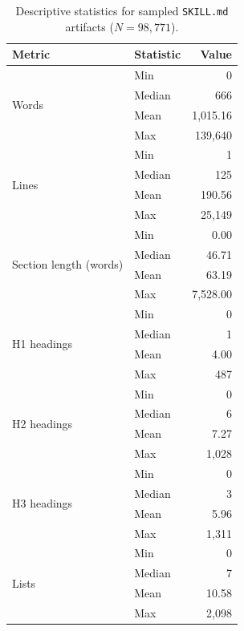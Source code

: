 \begin{table}[t]
\centering
\caption{Descriptive statistics for sampled \texttt{SKILL.md} artifacts
($N=98{,}771$).}
\label{tab:skillmd-structure}
\renewcommand{\arraystretch}{1.05}
\setlength{\tabcolsep}{5pt}

\begin{tabular}{llr}
\toprule
\textbf{Metric} & \textbf{Statistic} & \textbf{Value} \\
\midrule

\multirow{4}{*}{Words}
& Min    & 0         \\
& Median & 666       \\
& Mean   & 1,015.16  \\
& Max    & 139,640   \\
\midrule

\multirow{4}{*}{Lines}
& Min    & 1         \\
& Median & 125       \\
& Mean   & 190.56    \\
& Max    & 25,149    \\
\midrule

\multirow{4}{*}{Section length (words)}
& Min    & 0.00      \\
& Median & 46.71     \\
& Mean   & 63.19     \\
& Max    & 7,528.00  \\
\midrule

\multirow{4}{*}{H1 headings}
& Min    & 0         \\
& Median & 1         \\
& Mean   & 4.00      \\
& Max    & 487       \\
\midrule

\multirow{4}{*}{H2 headings}
& Min    & 0         \\
& Median & 6         \\
& Mean   & 7.27      \\
& Max    & 1,028     \\
\midrule

\multirow{4}{*}{H3 headings}
& Min    & 0         \\
& Median & 3         \\
& Mean   & 5.96      \\
& Max    & 1,311     \\
\midrule

\multirow{4}{*}{Lists}
& Min    & 0         \\
& Median & 7         \\
& Mean   & 10.58     \\
& Max    & 2,098     \\
\midrule


\end{tabular}
\end{table}
